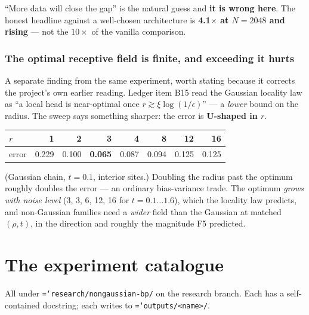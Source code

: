 \documentclass[11pt,a4paper]{article}
\newcommand{\code}[1]{\texttt{\small\hyphenchar\font=`\-\relax #1}}
\begin{document}
\begin{keybox}
``More data will close the gap'' is the natural guess and \textbf{it is wrong here}. The
honest headline against a well-chosen architecture is \textbf{4.1$\times$ at $N=2048$ and
rising} --- not the $10\times$ of the vanilla comparison.
\end{keybox}

\subsubsection*{The optimal receptive field is finite, and exceeding it hurts}

A separate finding from the same experiment, worth stating because it corrects the project's
own earlier reading. Ledger item B15 read the Gaussian locality law as ``a local head is
near-optimal once $r \gtrsim \xi\log(1/\epsilon)$'' --- a \emph{lower} bound on the radius.
The sweep says something sharper: the error is \textbf{U-shaped in $r$}.

\begin{center}
\begin{tabular}{@{}lrrrrrrr@{}}
\toprule
$r$ & 1 & 2 & \textbf{3} & 4 & 8 & 12 & 16 \\
\midrule
error & 0.229 & 0.100 & \textbf{0.065} & 0.087 & 0.094 & 0.125 & 0.125 \\
\bottomrule
\end{tabular}
\end{center}

\noindent
(Gaussian chain, $t=0.1$, interior sites.) Doubling the radius past the optimum roughly
doubles the error --- an ordinary bias-variance trade. The optimum \emph{grows with noise
level} (3, 3, 6, 12, 16 for $t=0.1 \dots 1.6$), which the locality law predicts, and
non-Gaussian families need a \emph{wider} field than the Gaussian at matched $(\rho,t)$,
in the direction and roughly the magnitude F5 predicted.

\newpage
\section{The experiment catalogue}
\label{sec:experiments}

All under \code{research/nongaussian-bp/} on the research branch. Each has a self-contained
docstring; each writes to \code{outputs/<name>/}.
\end{document}
